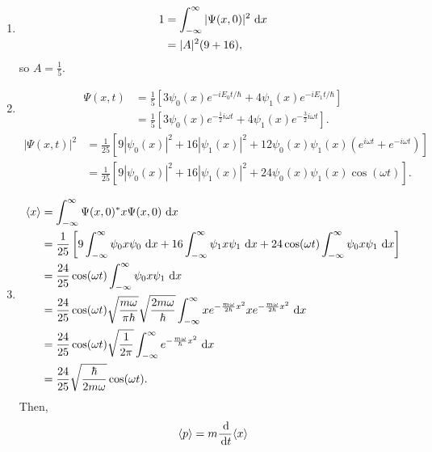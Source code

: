 \documentclass[en, oneside]{vivi}
\begin{document}
\begin{sol}
    \begin{enumerate}[label=(\alph*)]
        \item \begin{align*}
            1 &= \int_{-\infty}^{\infty} |\Psi(x, 0)|^2 \dif x\\
            &= |A|^2 ( 9 + 16 ),
        \end{align*}
        so $A = \frac{1}{5}$.
        \item \begin{align*}
            \Psi(x, t) &= \frac{1}{5} \left[ 3\psi_0(x) e^{-iE_0t/\hbar} + 4\psi_1(x) e^{-iE_1t/\hbar} \right]\\
            &= \frac{1}{5} \left[ 3\psi_0(x) e^{-\frac{1}{2}i\omega t} + 4\psi_1(x) e^{-\frac{3}{2}i\omega t} \right].
        \end{align*}
        \begin{align*}
            |\Psi(x, t)|^2 &= \frac{1}{25} \left[ 9|\psi_0(x)|^2 + 16|\psi_1(x)|^2 + 12 \psi_0(x) \psi_1(x) (e^{i\omega t} + e^{-i\omega t}) \right]\\
            &= \frac{1}{25} \left[ 9|\psi_0(x)|^2 + 16|\psi_1(x)|^2 + 24 \psi_0(x) \psi_1(x) \cos(\omega t) \right].
        \end{align*}
        \item \begin{align*}
            \langle x \rangle &= \int_{-\infty}^{\infty} \Psi(x, 0)^* x \Psi(x, 0) \dif x\\
            &= \frac{1}{25} \left[ 9 \int_{-\infty}^{\infty} \psi_0 x \psi_0 \dif x + 16 \int_{-\infty}^{\infty} \psi_1 x \psi_1 \dif x + 24 \cos(\omega t) \int_{-\infty}^{\infty} \psi_0 x \psi_1 \dif x \right]\\
            &= \frac{24}{25} \cos(\omega t) \int_{-\infty}^{\infty} \psi_0 x \psi_1 \dif x\\
            &= \frac{24}{25} \cos(\omega t) \sqrt{\frac{m \omega}{\pi \hbar}} \sqrt{\frac{2 m \omega}{\hbar}} \int_{-\infty}^\infty x e^{-\frac{m\omega}{2\hbar}x^2} x e^{-\frac{m\omega}{2\hbar}x^2} \dif x\\
            &= \frac{24}{25} \cos(\omega t) \sqrt{\frac{1}{2\pi}} \int_{-\infty}^\infty e^{-\frac{m \omega}{\hbar}x^2} \dif x\\
            &= \frac{24}{25} \sqrt{\frac{\hbar}{2 m \omega}} \cos(\omega t).
        \end{align*}
        Then,
        \begin{align*}
            \langle p \rangle &= m \frac{\dif}{\dif t} \langle x \rangle\\

\end{align*}
\end{enumerate}
\end{sol}
\end{document}
